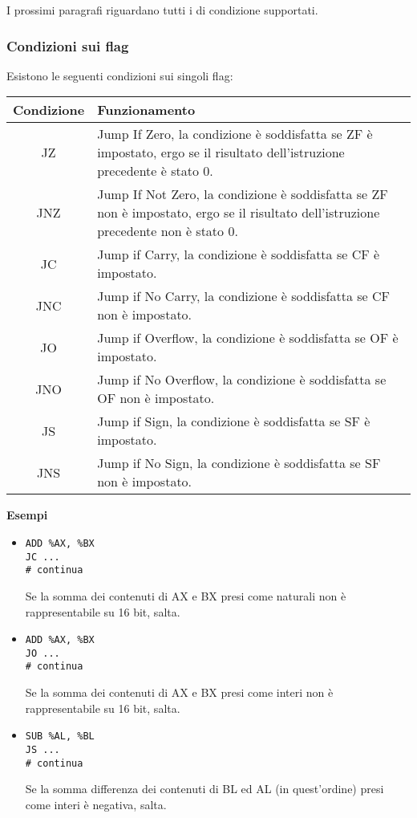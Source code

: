 \documentclass[a4paper,11pt]{article}
\begin{document}
I prossimi paragrafi riguardano tutti i di condizione supportati.

\subsubsection{Condizioni sui flag}
Esistono le seguenti condizioni sui singoli flag:

\begin{table}[h!]
	\center {}
	\begin{tabular} { c  p{10cm} }
		\bfseries Condizione & \bfseries Funzionamento \\
		\hline 
		JZ & Jump If Zero, la condizione è soddisfatta se ZF è impostato, ergo se il risultato dell'istruzione precedente è stato 0. \\ 
		JNZ & Jump If Not Zero, la condizione è soddisfatta se ZF non è impostato, ergo se il risultato dell'istruzione precedente non è stato 0. \\ 
		JC & Jump if Carry, la condizione è soddisfatta se CF è impostato. \\
		JNC & Jump if No Carry, la condizione è soddisfatta se CF non è impostato. \\ 
		JO & Jump if Overflow, la condizione è soddisfatta se OF è impostato. \\
		JNO & Jump if No Overflow, la condizione è soddisfatta se OF non è impostato. \\ 
		JS & Jump if Sign, la condizione è soddisfatta se SF è impostato. \\
		JNS & Jump if No Sign, la condizione è soddisfatta se SF non è impostato. \\ 
	\end{tabular}
\end{table}

\par\medskip
\noindent
\textbf{\textsf{Esempi}} \\
\begin{itemize}
	\item 
\begin{lstlisting}[style=codestyle]	
ADD %AX, %BX
JC ...
# continua
\end{lstlisting}
Se la somma dei contenuti di AX e BX presi come naturali non è rappresentabile su 16 bit, salta.

	\item 
\begin{lstlisting}[style=codestyle]	
ADD %AX, %BX
JO ...
# continua
\end{lstlisting}
Se la somma dei contenuti di AX e BX presi come interi non è rappresentabile su 16 bit, salta.

	\item 
\begin{lstlisting}[style=codestyle]	
SUB %AL, %BL
JS ...
# continua
\end{lstlisting}
Se la somma differenza dei contenuti di BL ed AL (in quest'ordine) presi come interi è negativa, salta.
\end{itemize}
\end{document}
